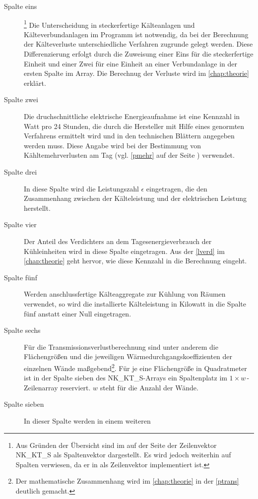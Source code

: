 \begin{description}

	\item [Spalte eins]\footnote{ Aus Gr\"unden der \"Ubersicht sind im
	 auf der Seite \pageref{fridge} der Zeilenvektor
	NK\_KT\_S als Spaltenvektor dargestellt. Es wird jedoch weiterhin auf
	Spalten verwiesen, da er in \matlab als Zeilenvektor implementiert ist.}
	Die Unterscheidung in steckerfertige Kälteanlagen und
	Kälteverbundanlagen im Programm ist notwendig, da bei der Berechnung der
	Kälteverluste unterschiedliche Verfahren zugrunde gelegt werden. Diese
	Differenzierung erfolgt durch die Zuweisung einer Eins für die
	steckerfertige Einheit und einer Zwei für eine Einheit an einer
	Verbundanlage in der ersten Spalte im Array. Die Berechnug der Verluste
	wird im \cref{chap:theorie} erkl\"art.
	\item [{Spalte zwei}] Die druchschnittliche elektrische Energieaufnahme
	ist eine Kennzahl in Watt pro 24 Stunden, die durch die Hersteller mit
	Hilfe eines genormten Verfahrens ermittelt wird und in den technischen
	Blättern angegeben werden muss. Diese Angabe wird bei der Bestimmung von
	K\"ahltemehrverlusten am Tag (vgl. \cref{pmehr} auf der Seite
	\pageref{pmehr}) verwendet.
	\item [{Spalte drei}] In diese Spalte wird die Leistungszahl $\epsilon$
	eingetragen, die den Zusammenhang zwischen der K\"alteleistung und der
	elektrischen Leistung herstellt.
	\item [{Spalte vier}] Der Anteil des Verdichters an dem
	Tagesenergieverbrauch der K\"uhleinheiten wird in diese Spalte
	eingetragen. Aus der \cref{lverd} im \cref{chap:theorie} geht hervor,
	wie diese Kennzahl in die Berechnung eingeht.
	\item [{Spalte fünf}] Werden anschlussfertige Kälteaggregate zur Kühlung
	von Räumen verwendet, so wird die installierte Kälteleistung in Kilowatt
	in die Spalte fünf anstatt einer Null eingetragen.
	\item [{Spalte sechs}] Für die Transmissionsverlustberechnung sind
	unter anderem die Flächengrößen und die jeweiligen
	Wärmedurchgangskoeffizienten der einzelnen Wände
	maßgebend\footnote{ Der mathematische Zusammenhang wird
	im \cref{chap:theorie} in der \cref{ptrans} deutlich gemacht.}. Für je
	eine Flächengröße in Quadratmeter ist in der Spalte sieben des
	NK\_KT\_S-Arrays ein Spaltenplatz im $1\times w\,$-Zeilenarray
	reserviert. $w$ steht für die Anzahl der Wände.
	\item [{Spalte sieben}] In dieser Spalte werden in einem weiteren

\end{description}
